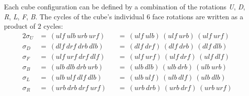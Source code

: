 \documentclass[12pt,a4paper]{article}
\theoremstyle{custom}
\begin{document}
 
\vspace{1cm}
Each cube configuration can be defined by a combination of the rotations \textit{U}, \textit{D}, \textit{R}, \textit{L}, \textit{F}, \textit{B}. 
The cycles of the cube's individual 6 face rotations are written as a product of $2$ cycles:
\begin{alignat*}{2}
\sigma_U &  = \ ( \textit{ulf} \ \textit{ulb} \ \textit{urb} \ \textit{urf} ) &&  = \ ( \textit{ulf} \ \textit{ulb} )   \ 
( \textit{ulf} \ \textit{urb} )  \ 
( \textit{ulf} \  \textit{urf} )\\

\sigma_D & = \ ( \textit{dlf} \ \textit{drf} \ \textit{drb} \ \textit{dlb} )  && = \ ( \textit{dlf} \ \textit{drf} )  \ 
( \textit{dlf} \ \textit{drb}  )  \ 
( \textit{dlf} \ \textit{dlb} )\\

\sigma_F & = \ ( \textit{ulf} \ \textit{urf} \ \textit{drf} \ \textit{dlf} )  && = \ ( \textit{ulf} \ \textit{urf} ) \ 
( \textit{ulf} \ \textit{drf} ) \ 
( \textit{ulf}  \ \textit{dlf} ) \\

\sigma_B & = \ ( \textit{ulb} \ \textit{dlb} \ \textit{drb} \ \textit{urb} )  && = \ ( \textit{ulb} \ \textit{dlb} ) \ 
( \textit{ulb} \  \textit{drb} ) \ 
( \textit{ulb}  \ \textit{urb} )\\

\sigma_L & = \ ( \textit{ulb} \ \textit{ulf} \ \textit{dlf} \ \textit{dlb} )  && = \ ( \textit{ulb} \ \textit{ulf} )  \ 
( \textit{ulb} \ \textit{dlf}  )  \ 
( \textit{ulb} \ \textit{dlb} ) \\

\sigma_R & = \ ( \textit{urb} \ \textit{drb} \ \textit{drf} \ \textit{urf} ) && = \  ( \textit{urb} \ \textit{drb}  )  \ 
( \textit{urb} \  \textit{drf} )  \ 
( \textit{urb} \ \textit{urf} )  \
\end{alignat*}
\end{document}

